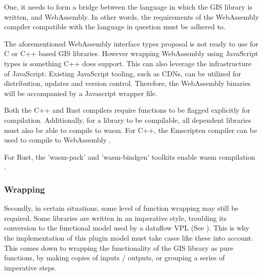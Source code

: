 One, it needs to form a bridge between the language in which the GIS library is written, and WebAssembly. 
In other words, the requirements of the WebAssembly compiler compatible with the language in question must be adhered to.
 
The aforementioned WebAssembly interface types proposal is not ready to use for C or C++ based GIS libraries.  
However wrapping WebAssembly using JavaScript types is something C++ does support. 
This can also leverage the infrastructure of JavaScript:
Existing JavaScript tooling, such as \ac{CDN}s, can be utilized for distribution, updates and version control.
Therefore, the WebAssembly binaries will be accompanied by a Javascript wrapper file.

Both the C++ and Rust compilers require functions to be flagged explicitly for compilation. 
Additionally, for a library to be compilable, all dependent libraries must also be able to compile to wasm.
For C++, the Emscripten compiler can be used to compile to WebAssembly \citep*{zakai_emscripten_2011}. 

For Rust, the 'wasm-pack' and 'wasm-bindgen' toolkits enable \ac{wasm} compilation \citep{contributors_wasm-bindgen_2022,contributors_wasm-pack_2022}.

\subsubsection{Wrapping}

Secondly, in certain situations, some level of function wrapping may still be required. 
Some libraries are written in an imperative style, troubling its conversion to the functional model used by a dataflow VPL (See ).
This is why the implementation of this plugin model must take cases like these into account. 
This comes down to wrapping the functionality of the GIS library as pure functions, by making copies of inputs / outputs, or grouping a series of imperative steps.

